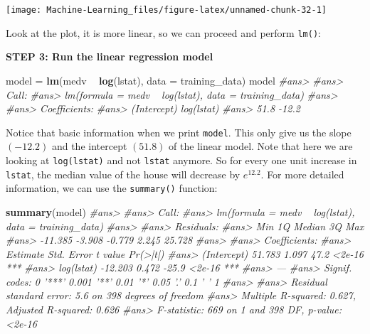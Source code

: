 \documentclass[]{book}
\newenvironment{Shaded}{\begin{snugshade}}{\end{snugshade}}
\newcommand{\KeywordTok}[1]{\textcolor[rgb]{0.13,0.29,0.53}{\textbf{#1}}}
\newcommand{\DataTypeTok}[1]{\textcolor[rgb]{0.13,0.29,0.53}{#1}}
\newcommand{\StringTok}[1]{\textcolor[rgb]{0.31,0.60,0.02}{#1}}
\newcommand{\CommentTok}[1]{\textcolor[rgb]{0.56,0.35,0.01}{\textit{#1}}}
\newcommand{\OperatorTok}[1]{\textcolor[rgb]{0.81,0.36,0.00}{\textbf{#1}}}
\newcommand{\NormalTok}[1]{#1}
\begin{document}
\begin{center}\texttt{[image: Machine-Learning\_files/figure-latex/unnamed-chunk-32-1]} \end{center}

Look at the plot, it is more linear, so we can proceed and perform
\texttt{lm()}:

\textbf{STEP 3: Run the linear regression model}

\begin{Shaded}
\begin{Highlighting}[]
\NormalTok{model =}\StringTok{ }\KeywordTok{lm}\NormalTok{(medv }\OperatorTok{~}\StringTok{ }\KeywordTok{log}\NormalTok{(lstat), }\DataTypeTok{data =}\NormalTok{ training_data)}
\NormalTok{model}
\CommentTok{#ans> }
\CommentTok{#ans> Call:}
\CommentTok{#ans> lm(formula = medv ~ log(lstat), data = training_data)}
\CommentTok{#ans> }
\CommentTok{#ans> Coefficients:}
\CommentTok{#ans> (Intercept)   log(lstat)  }
\CommentTok{#ans>        51.8        -12.2}
\end{Highlighting}
\end{Shaded}

Notice that basic information when we print \texttt{model}. This only
give us the slope \((-12.2)\) and the intercept \((51.8)\) of the linear
model. Note that here we are looking at \texttt{log(lstat)} and not
\texttt{lstat} anymore. So for every one unit increase in
\texttt{lstat}, the median value of the house will decrease by
\(e^{12.2}\). For more detailed information, we can use the
\texttt{summary()} function:

\begin{Shaded}
\begin{Highlighting}[]
\KeywordTok{summary}\NormalTok{(model)}
\CommentTok{#ans> }
\CommentTok{#ans> Call:}
\CommentTok{#ans> lm(formula = medv ~ log(lstat), data = training_data)}
\CommentTok{#ans> }
\CommentTok{#ans> Residuals:}
\CommentTok{#ans>     Min      1Q  Median      3Q     Max }
\CommentTok{#ans> -11.385  -3.908  -0.779   2.245  25.728 }
\CommentTok{#ans> }
\CommentTok{#ans> Coefficients:}
\CommentTok{#ans>             Estimate Std. Error t value Pr(>|t|)    }
\CommentTok{#ans> (Intercept)   51.783      1.097    47.2   <2e-16 ***}
\CommentTok{#ans> log(lstat)   -12.203      0.472   -25.9   <2e-16 ***}
\CommentTok{#ans> ---}
\CommentTok{#ans> Signif. codes:  0 '***' 0.001 '**' 0.01 '*' 0.05 '.' 0.1 ' ' 1}
\CommentTok{#ans> }
\CommentTok{#ans> Residual standard error: 5.6 on 398 degrees of freedom}
\CommentTok{#ans> Multiple R-squared:  0.627,   Adjusted R-squared:  0.626 }
\CommentTok{#ans> F-statistic:  669 on 1 and 398 DF,  p-value: <2e-16}
\end{Highlighting}
\end{Shaded}
\end{document}
